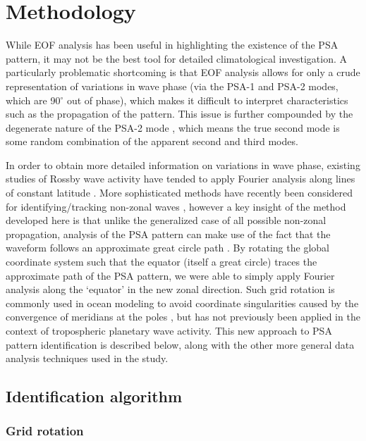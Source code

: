 \section{Methodology}

While EOF analysis has been useful in highlighting the existence of the PSA pattern, it may not be the best tool for detailed climatological investigation. A particularly problematic shortcoming is that EOF analysis allows for only a crude representation of variations in wave phase (via the PSA-1 and PSA-2 modes, which are 90$^{\circ}$ out of phase), which makes it difficult to interpret characteristics such as the propagation of the pattern. This issue is further compounded by the degenerate \citep{North1982} nature of the PSA-2 mode \citep[e.g. Figure 1;][]{Mo2000}, which means the true second mode is some random combination of the apparent second and third modes.

In order to obtain more detailed information on variations in wave phase, existing studies of Rossby wave activity have tended to apply Fourier analysis along lines of constant latitude \citep[e.g.][]{Glatt2014}. More sophisticated methods have recently been considered for identifying/tracking non-zonal waves \citep[e.g.][]{Zimin2006,Souders2014}, however a key insight of the method developed here is that unlike the generalized case of all possible non-zonal propagation, analysis of the PSA pattern can make use of the fact that the waveform follows an approximate great circle path \citep{Hoskins1981}. By rotating the global coordinate system such that the equator (itself a great circle) traces the approximate path of the PSA pattern, we were able to simply apply Fourier analysis along the `equator' in the new zonal direction. Such grid rotation is commonly used in ocean modeling to avoid coordinate singularities caused by the convergence of meridians at the poles \citep[i.e. the grid is rotated to place the north pole over land; e.g.][]{Bonaventura2012}, but has not previously been applied in the context of tropospheric planetary wave activity. This new approach to PSA pattern identification is described below, along with the other more general data analysis techniques used in the study.

\subsection{Identification algorithm}

\subsubsection{Grid rotation}

